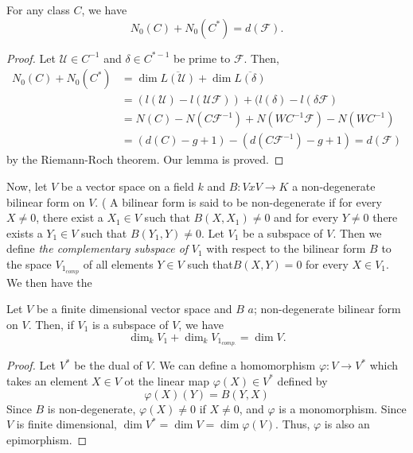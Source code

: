 \begin{Lemma}\label{chap14:sec27:lem3}%
  For  any class $C$, we have 
  $$
  N_0 (C) + N_0 (C^*) = d ( \mathcal{F} ).
  $$
\end{Lemma}

\begin{proof}
  Let $ \mathscr{U} \in C^{-1} $ and $ \delta \in C^{* -1} $ be prime
  to $ \mathcal{F} $. Then,  
  \begin{align*}
    N_0 (C) + N_0 (C^*) &=  \dim \overline{L ( \mathscr{U} )}+ \dim
    \overline{L ( \delta )} \\ 
    &= (l (\mathscr{U}) - l ( \mathscr{U} \mathcal{F} )) + (l (\delta)
    - l ( \delta \mathcal{F}) \\ 
    &= N (C) - N ( C \mathcal{F}^{-1} ) + N (WC^{-1} \mathcal{F} ) - N
    ( WC^{-1} ) \\ 
    &= (d (C) - g +1 ) - (d( C \mathcal{F}^{-1} ) - g+1 ) = d
    (\mathcal{F} ) 
  \end{align*}
  by the Riemann-Roch theorem. Our lemma is proved.
\end{proof}

Now, let $V$ be a vector space on a field $k$ and $ B : V x V
\rightarrow K $ a non-degenerate bilinear form on $V$. ( A bilinear
form is said to be non-degenerate if for every $ X \neq 0 $, there
exist a  $ X_1 \in V $ such that $ B (X,X_1 ) \neq 0 $ and for every $
Y \neq 0 $ there exists a $ Y_1 \in V $ such that $ B ( Y_1,Y ) \neq 0
$. Let $V_1$ be a subspace of $V$. Then  we define \textit{the
  complementary subspace of } $ V_1 $ with respect to the bilinear form
$B$ to the space $ V_{1_{comp}} $ of all elements $ Y \in V $ such
that\pageoriginale $ B ( X, Y ) = 0 $ for every $X \in V_1 $. We then have the   

\begin{Lemma}\label{chap14:sec27:lem4}%
  Let $V$ be a finite dimensional vector space and $B$ $a$;
  non-degenerate bilinear form on $V$. Then, if $V_1$ is a subspace of
  $V$, we have  
  $$
  \dim_k V_1 + \dim_k V_{1_{comp.}}  = \dim V .
  $$
\end{Lemma}

\begin{proof}
  Let $V^*$ be the dual of $V$. We can define a homomorphism $ \varphi
  : V \rightarrow V^* $ which takes an element $ X \in V $ ot the
  linear map $\varphi (X) \in V^* $ defined by  
  $$
  \varphi (X) (Y) = B( Y,X )
  $$
  Since $B$ is non-degenerate, $ \varphi (X) \neq 0 $ if $ X \neq 0 $,
  and $ \varphi $ is a monomorphism. Since $V$ is finite dimensional,
  $ \dim V^* = \dim V = \dim \varphi (V) $. Thus, $ \varphi $ is also
  an epimorphism.  
\end{proof}

